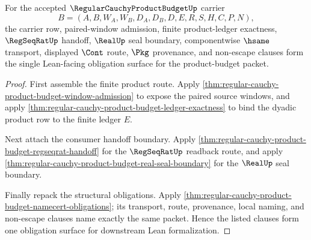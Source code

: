 \begin{theorem}
\label{thm:regular-cauchy-product-budget-checked-obligation-readiness}
For the accepted $\RegularCauchyProductBudgetUp$ carrier
$$
B=(A,B,W_A,W_B,D_A,D_B,D,E,R,S,H,C,P,N),
$$
the carrier row, paired-window admission, finite product-ledger exactness, $\RegSeqRatUp$ handoff, $\RealUp$ seal boundary, componentwise $\hsame$ transport, displayed $\Cont$ route, $\Pkg$ provenance, and non-escape clauses form the single Lean-facing obligation surface for the product-budget packet.
\end{theorem}
\begin{proof}
First assemble the finite product route. Apply \autoref{thm:regular-cauchy-product-budget-window-admission} to expose the paired source windows, and apply \autoref{thm:regular-cauchy-product-budget-ledger-exactness} to bind the dyadic product row to the finite ledger $E$.

Next attach the consumer handoff boundary. Apply \autoref{thm:regular-cauchy-product-budget-regseqrat-handoff} for the $\RegSeqRatUp$ readback route, and apply \autoref{thm:regular-cauchy-product-budget-real-seal-boundary} for the $\RealUp$ seal boundary.

Finally repack the structural obligations. Apply \autoref{thm:regular-cauchy-product-budget-namecert-obligations}; its transport, route, provenance, local naming, and non-escape clauses name exactly the same packet. Hence the listed clauses form one obligation surface for downstream Lean formalization.
\end{proof}

